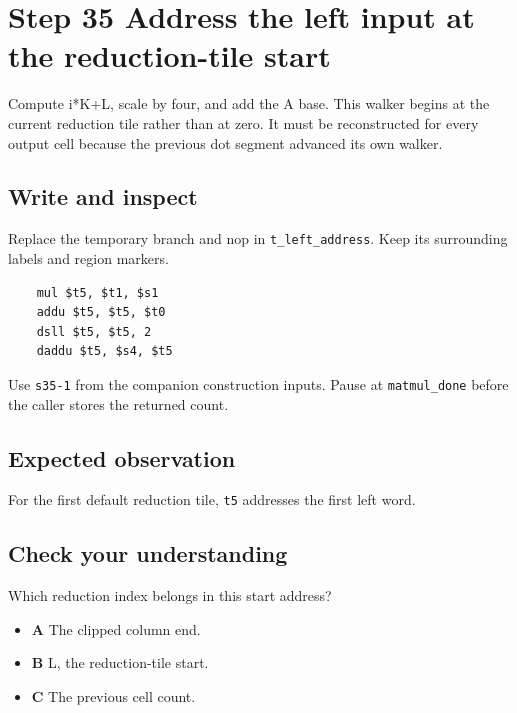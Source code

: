 \section{Step 35 Address the left input at the reduction-tile start}\label{matmul-s35}

Compute i*K+L, scale by four, and add the A base. This walker begins at the current reduction tile rather than at zero. It must be reconstructed for every output cell because the previous dot segment advanced its own walker.

\subsection{Write and inspect}
Replace the temporary branch and nop in \texttt{t\_left\_address}. Keep its surrounding labels and region markers.

\begin{verbatim}
    mul $t5, $t1, $s1
    addu $t5, $t5, $t0
    dsll $t5, $t5, 2
    daddu $t5, $s4, $t5
\end{verbatim}
Use \texttt{s35-1} from the companion construction inputs. Pause at \texttt{matmul\_done} before the caller stores the returned count.

\subsection{Expected observation}
For the first default reduction tile, \texttt{t5} addresses the first left word.

\subsection{Check your understanding}
Which reduction index belongs in this start address?

\begin{itemize}
\item \textbf{A} The clipped column end.
\item \textbf{B} L, the reduction-tile start.
\item \textbf{C} The previous cell count.
\end{itemize}
